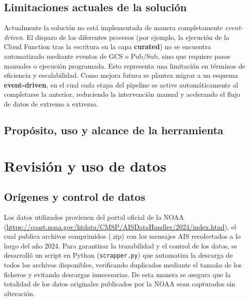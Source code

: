 \documentclass[10pt]{article}
\begin{document}
\subsection{Limitaciones actuales de la solución} %

Actualmente la solución no está implementada de manera completamente \textit{event-driven}. 
El disparo de los diferentes procesos (por ejemplo, la ejecución de la Cloud Function tras la escritura en la capa \textbf{curated}) no se encuentra automatizado mediante eventos de GCS o Pub/Sub, 
sino que requiere pasos manuales o ejecución programada. 
Esto representa una limitación en términos de eficiencia y escalabilidad. 
Como mejora futura se plantea migrar a un esquema \textbf{event-driven}, en el cual cada etapa del pipeline se active automáticamente al completarse la anterior, reduciendo la intervención manual y acelerando el flujo de datos de extremo a extremo.

\subsection{Propósito, uso y alcance de la herramienta} %
\section{Revisión y uso de datos}
\subsection{Orígenes y control de datos} %

Los datos utilizados provienen del portal oficial de la NOAA (\url{https://coast.noaa.gov/htdata/CMSP/AISDataHandler/2024/index.html}), el cual publica archivos comprimidos (.zip) con los mensajes AIS recolectados a lo largo del año 2024. 
Para garantizar la trazabilidad y el control de los datos, se desarrolló un script en Python (\texttt{scrapper.py}) que automatiza la descarga de todos los archivos disponibles, verificando duplicados mediante el tamaño de los ficheros y evitando descargas innecesarias. 
De esta manera se asegura que la totalidad de los datos originales publicados por la NOAA sean capturados sin alteración.
\end{document}
